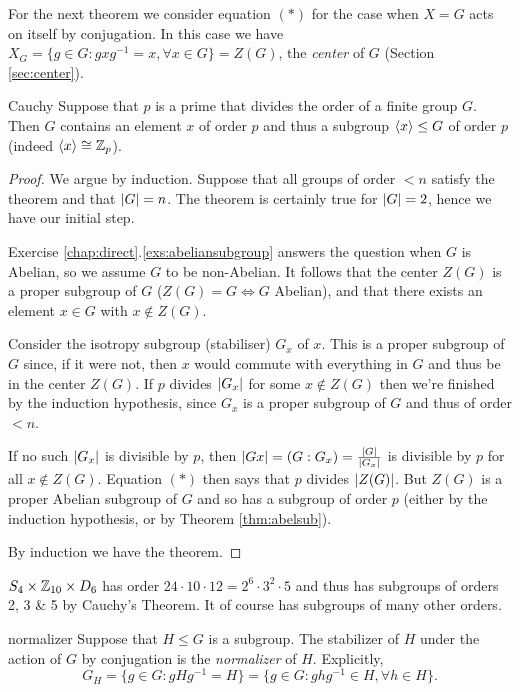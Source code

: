 For the next theorem we consider equation $(\ast)$ for the case when $X=G$ acts on itself by conjugation. In this case we have $X_G=\{g\in G:gxg^{-1}=x,\forall x\in G\}=Z(G)$, the \emph{center} of $G$ (Section \ref{sec:center}).

\begin{thm}{Cauchy}{}
Suppose that $p$ is a prime that divides the order of a finite group $G$. Then $ G$ contains an element $x$ of order $p$ and thus a subgroup $\left\langle x\right\rangle\le G$ of order $p$ (indeed $\left\langle x\right\rangle\cong\mathbb{Z}_p$).
\end{thm}

\begin{proof}
We argue by induction. Suppose that all groups of order $<n$ satisfy the theorem and that $\left| G\right|=n$. The theorem is certainly true for $\left| G\right|=2$, hence we have our initial step.

Exercise \ref*{chap:direct}.\ref{exs:abeliansubgroup} answers the question when $G$ is Abelian, so we assume $G$ to be non-Abelian. It follows that the center $Z(G)$ is a proper subgroup of $G$ ($Z(G)=G\iff G$ Abelian), and that there exists an element $x\in G$ with $x\notin Z(G)$.

Consider the isotropy subgroup (stabiliser) $G_x$ of $x$. This is a proper subgroup of $G$ since, if it were not, then $x$ would commute with everything in $G$ and thus be in the center $Z(G)$. If $p$ divides $\left| G_x\right|$ for some $x\notin Z(G)$ then we're finished by the induction hypothesis, since $G_x$ is a proper subgroup of $G$ and thus of order $<n$.

If no such $\left| G_x\right|$ is divisible by $p$, then $\left| Gx\right|=(G:G_x)=\frac{\left| G\right|}{\left| G_x\right|}$ is divisible by $p$ for all $x\notin Z(G)$. Equation $(\ast)$ then says that $p$ divides $\left| Z(G)\right|$. But $Z(G)$ is a proper Abelian subgroup of $G$ and so has a subgroup of order $p$ (either by the induction hypothesis, or by Theorem \ref{thm:abelsub}).

By induction we have the theorem.
\end{proof}

\begin{example}{}{}
$S_4\times \mathbb{Z}_{10}\times D_6$ has order $24\cdot 10\cdot 12=2^6\cdot 3^2\cdot 5$ and thus has subgroups of orders 2, 3 \& 5 by Cauchy's Theorem. It of course has subgroups of many other orders.
\end{example}


\begin{defn}{}{normalizer}
Suppose that $H\le G$ is a subgroup. The stabilizer of $H$ under the action of $G$ by conjugation is the \emph{normalizer} of $H$. Explicitly,
\[G_H=\{g\in G:gHg^{-1}=H\}=\{g\in G:ghg^{-1}\in H,\forall h\in H\}.\]
\end{defn}


